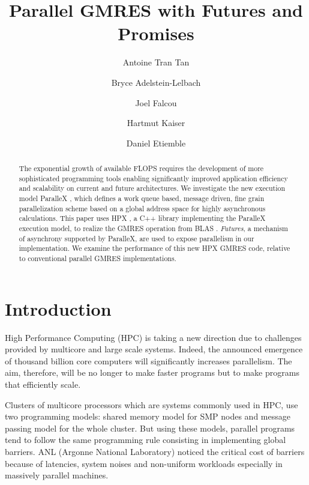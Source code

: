 \documentclass{llncs}
\begin{document}
\title{Parallel GMRES with Futures and Promises}

\author{Antoine Tran Tan \and Bryce Adelstein-Lelbach \and Joel Falcou \and Hartmut Kaiser \and
Daniel Etiemble }

\maketitle

\begin{abstract}
The exponential growth of available FLOPS requires the development of more sophisticated programming tools enabling significantly improved 
application efficiency and scalability on current and future architectures. We investigate the new execution model ParalleX \cite{ParalleX}, which defines a work queue based, message driven, fine grain parallelization scheme based on a global address space for highly asynchronous calculations. This paper uses HPX \cite{ParalleX}, a C++ library implementing the ParalleX execution model, to realize the GMRES operation from BLAS \cite{GMRES}. \emph{Futures}, a mechanism of asynchrony \cite{Futures1} \cite{Futures2} supported by ParalleX, are used to expose parallelism in our implementation. We examine the performance of this new HPX GMRES code, relative to conventional parallel GMRES implementations. 
\end{abstract}


\section{Introduction}\label{Introduction}
High Performance Computing (HPC) is taking a new direction due to challenges provided by multicore and large scale systems. Indeed, the announced emergence of thousand billion core computers will significantly increases parallelism. The aim, therefore, will be no longer to make faster programs but to make programs that efficiently scale.\smallskip 

Clusters of multicore processors which are systems commonly used in HPC, use two programming models: shared memory model for SMP nodes and message passing model for the whole cluster. But using these models, parallel programs tend to follow the same programming rule consisting in implementing global barriers. ANL (Argonne National Laboratory) noticed the critical cost of barriers because
of latencies, system noises and non-uniform workloads especially in massively parallel machines. \cite{Barrier}\smallskip 
\end{document}
